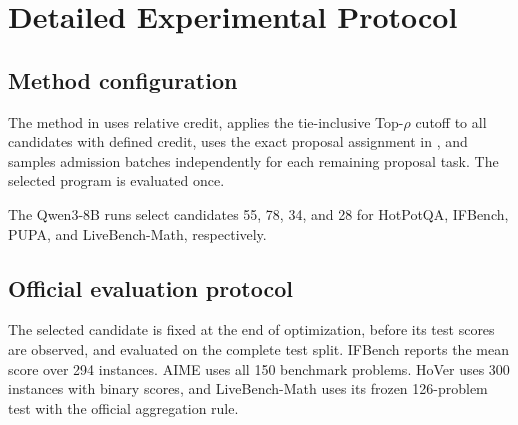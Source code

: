 \section{Detailed Experimental Protocol}
\label{app:protocol}

\subsection{Method configuration}
\label{app:frozen_identities}

The method in  uses
relative credit, applies the tie-inclusive Top-$\rho$ cutoff
to all candidates with defined credit, uses the exact proposal assignment in
, and samples admission batches independently for
each remaining proposal task.  The selected program is evaluated once.

The Qwen3-8B runs select candidates 55, 78, 34, and 28 for HotPotQA,
IFBench, PUPA, and LiveBench-Math, respectively.

\subsection{Official evaluation protocol}

The selected candidate is fixed at the end of optimization, before its test
scores are observed, and evaluated on the complete test split.  IFBench reports
the mean score over 294 instances.  AIME uses all 150 benchmark problems.
HoVer uses 300 instances with binary scores, and LiveBench-Math uses its
frozen 126-problem test with the official aggregation rule.

